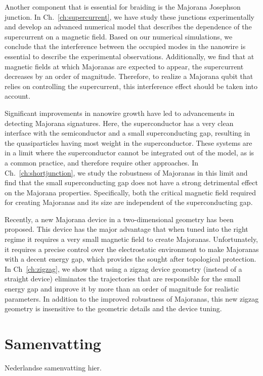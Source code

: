 Another component that is essential for braiding is the Majorana Josephson junction.
In Ch.~\ref{ch:supercurrent}, we have study these junctions experimentally and develop an advanced numerical model that describes the dependence of the supercurrent on a magnetic field.
Based on our numerical simulations, we conclude that the interference between the occupied modes in the nanowire is essential to describe the experimental observations.
Additionally, we find that at magnetic fields at which Majoranas are expected to appear, the supercurrent decreases by an order of magnitude.
Therefore, to realize a Majorana qubit that relies on controlling the supercurrent, this interference effect should be taken into account.

Significant improvements in nanowire growth have led to advancements in detecting Majorana signatures.
Here, the superconductor has a very clean interface with the semiconductor and a small superconducting gap, resulting in the quasiparticles having most weight in the superconductor.
These systems are in a limit where the superconductor cannot be integrated out of the model, as is a common practice, and therefore require other approaches.
In Ch.~\ref{ch:shortjunction}, we study the robustness of Majoranas in this limit and find that the small superconducting gap does not have a strong detrimental effect on the Majorana properties.
Specifically, both the critical magnetic field required for creating Majoranas and its size are independent of the superconducting gap.

Recently, a new Majorana device in a two-dimensional geometry has been proposed.
This device has the major advantage that when tuned into the right regime it requires a very small magnetic field to create Majoranas.
Unfortunately, it requires a precise control over the electrostatic environment to make Majoranas with a decent energy gap, which provides the sought after topological protection.
In Ch~\ref{ch:zigzag}, we show that using a zigzag device geometry (instead of a straight device) eliminates the trajectories that are responsible for the small energy gap and improve it by more than an order of magnitude for realistic parameters.
In addition to the improved robustness of Majoranas, this new zigzag geometry is insensitive to the geometric details and the device tuning.


\chapter*{Samenvatting}
{

Nederlandse samenvatting hier.

}